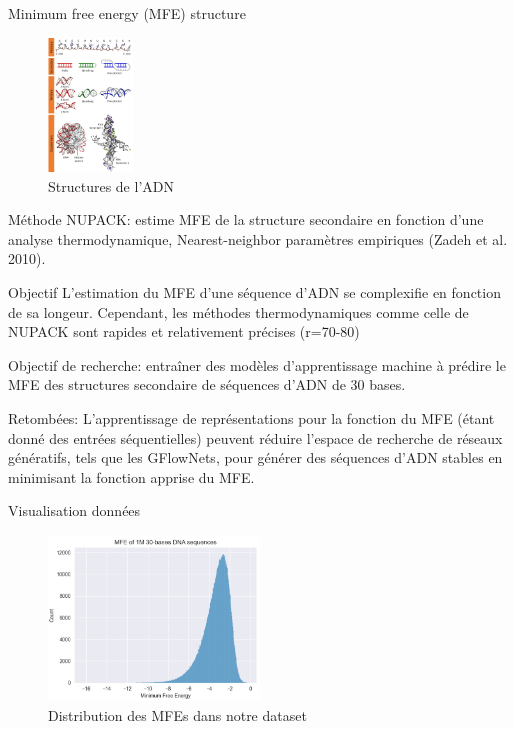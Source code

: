 \documentclass{beamer}
\begin{document}
\begin{frame}{Minimum free energy (MFE) structure}

\begin{figure} \label{fig:ADN_structure}
    \caption{Structures de l'ADN} \center
    \includegraphics[width=0.2\textwidth]{images/DNA_structure.png}
\end{figure}

Méthode NUPACK: estime MFE de la structure secondaire en fonction d'une analyse thermodynamique, Nearest-neighbor paramètres empiriques (Zadeh et al. 2010).

\end{frame}

\begin{frame}{Objectif}
L'estimation du MFE d'une séquence d'ADN se complexifie en fonction de sa longeur. Cependant, les méthodes thermodynamiques comme celle de NUPACK sont rapides et relativement précises (r=70-80)

Objectif de recherche: entraîner des modèles d'apprentissage machine à prédire le MFE des structures secondaire de séquences d'ADN de 30 bases.

Retombées: L'apprentissage de représentations pour la fonction du MFE (étant donné des entrées séquentielles) peuvent réduire l'espace de recherche de réseaux génératifs, tels que les GFlowNets, pour générer des séquences d'ADN stables en minimisant la fonction apprise du MFE.

\end{frame}

\begin{frame}{Visualisation données}

\begin{figure} \label{fig:MFE_nupack}
    \caption{Distribution des MFEs dans notre dataset} \center
    \includegraphics[width=0.5\textwidth]{images/MFE_nupack.png}
\end{figure}

\end{frame}
\end{document}
